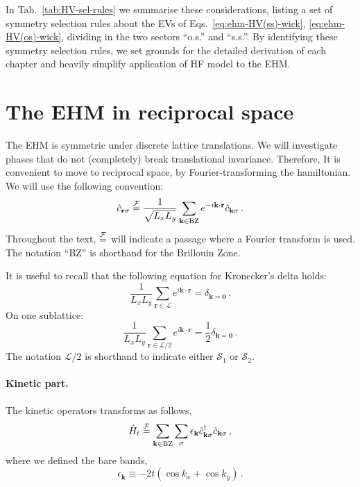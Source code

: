 In Tab.~\ref{tab:HV-sel-rules} we summarise these considerations, listing a set of symmetry selection rules about the EVs of Eqs.~\eqref{eq:ehm-HV(ss)-wick}, \eqref{eq:ehm-HV(os)-wick}, dividing in the two sectors ``o.s.'' and ``s.s.''. By identifying these symmetry selection rules, we set grounds for the detailed derivation of each chapter and heavily simplify application of HF model to the EHM.

\section{The EHM in reciprocal space}

The EHM is symmetric under discrete lattice translations. We will investigate phases that do not (completely) break translational invariance. Therefore, It is convenient to move to reciprocal space, by Fourier-transforming the hamiltonian. We will use the following convention:
\begin{equation}\label{eq:fourier-convention}
	\hat c_{\mathbf{r}\sigma} \stackrel{\mathcal{F}}{=} \frac{1}{\sqrt{L_xL_y}} \sum_{\mathbf{k} \in \mathrm{BZ}} e^{-i \mathbf{k} \cdot \mathbf{r}} \hat c_{\mathbf{k}\sigma} \, .
\end{equation}
Throughout the text, $\stackrel{\mathcal{F}}{=}$ will indicate a passage where a Fourier transform is used. The notation ``BZ'' is shorthand for the Brillouin Zone.

It is useful to recall that the following equation for Kronecker's delta holds:
\begin{equation}\label{eq:ehm-delta}
	\frac{1}{L_x L_y} \sum_{\mathbf{r} \in \mathcal{L}} e^{i \mathbf{k} \cdot \mathbf{r}} = \delta_{\mathbf{k}=\mathbf{0}} \, .
\end{equation}
On one  sublattice:
\begin{equation}\label{eq:ehm-delta/2}
	\frac{1}{L_x L_y} \sum_{\mathbf{r} \in \mathcal{L}/2} e^{i \mathbf{k} \cdot \mathbf{r}} = \frac{1}{2} \delta_{\mathbf{k}=\mathbf{0}} \, .
\end{equation}
The notation $\mathcal{L}/2$ is shorthand to indicate either $\mathcal{S}_1$ or $\mathcal{S}_2$.

\paragraph{Kinetic part.}

The kinetic operators transforms as follows,
\begin{equation}\label{eq:Ht-Fourier}
	\hat H_t \stackrel{\mathcal{F}}{=} \sum_{\mathbf{k} \in \mathrm{BZ}} \sum_\sigma \epsilon_\mathbf{k} \hat c_{\mathbf{k}\sigma}^\dagger \hat c_{\mathbf{k}\sigma} \, ,
\end{equation}
where we defined the bare bands,
\begin{equation}\label{eq:bare-bands}
	\epsilon_\mathbf{k} \equiv -2t \left(
	\cos k_x + \cos k_y
	\right) \, .
\end{equation}

